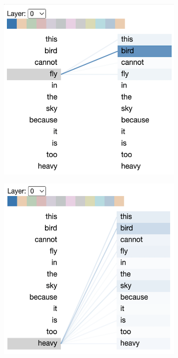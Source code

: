 \documentclass[]{article}
\begin{document}
\begin{figure}[!h]
\begin{subfigure}[b]{0.48\textwidth}
    \end{subfigure}
    \vfill
    \begin{subfigure}[b]{0.48\textwidth}
        \includegraphics[width=\textwidth]{FIGS/gpt2_head_l0_fly.png}
    \end{subfigure}
    \hfill
    \begin{subfigure}[b]{0.48\textwidth}
        \includegraphics[width=\textwidth]{FIGS/gpt2_head_l0_heavy.png}

\end{subfigure}
\end{figure}
\end{document}
